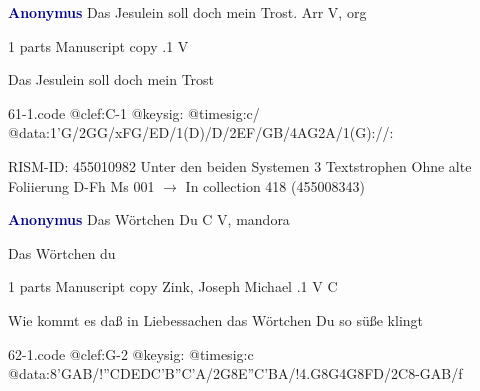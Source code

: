 \documentclass[twocolumn]{book}
\begin{document}
\newline \par \vspace{7pt} \textcolor{darkblue}{\textbf{Anonymus  }}
\newline Das Jesulein soll doch mein Trost. Arr    
\newline V, org
\newline \begin{itshape}\end{itshape} 
\newline \textcolor{darkblue}{}  1 parts  
\newline Manuscript copy
.1  V
\newline \begin{footnotesize} Das Jesulein soll doch mein Trost \end{footnotesize}  
\begin{filecontents*}{61-1.code}
@clef:C-1
@keysig:
@timesig:c/
@data:1'G/2GG/xFG/ED/1(D)/D/2EF/GB/4AG2A/1(G)://:
\end{filecontents*}
\newline
%

\newline RISM-ID: 455010982
\newline Unter den beiden Systemen 3 Textstrophen
\newline Ohne alte Foliierung
\newline D-Fh  Ms 001
\newline $\rightarrow$ In collection 418 (455008343)

\newline \par \vspace{7pt} \textcolor{darkblue}{\textbf{Anonymus  }}
\newline Das Wörtchen Du  C  
\newline V, mandora
\newline \begin{itshape}[heading, f.57v:] Das Wörtchen du\end{itshape} 
\newline \textcolor{darkblue}{}  1 parts  
\newline Manuscript copy
\newline Zink, Joseph Michael
.1  V  C
\newline \begin{footnotesize} Wie kommt es daß in Liebessachen das Wörtchen Du so süße klingt \end{footnotesize}  
\begin{filecontents*}{62-1.code}
@clef:G-2
@keysig:
@timesig:c
@data:8'GAB/!{''CD}{ED}{C'B}{''C'A}/2G8E''C'BA/!4.G8G4G8FD/2C8-GAB/f
\end{filecontents*}
\newline
%
\end{document}
